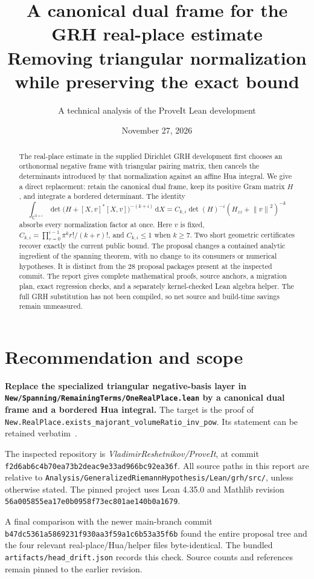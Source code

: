 \documentclass[11pt,letterpaper]{article}
\title{\textbf{A canonical dual frame for the GRH real-place estimate}\\[6pt]
  \large Removing triangular normalization while preserving the exact bound}
\author{A technical analysis of the ProveIt Lean development}
\date{November 27, 2026}
\theoremstyle{remark}
\newcommand{\C}{\mathbb C}
\newcommand{\dd}{\,\mathrm d}
\newcommand{\norm}[1]{\left\lVert#1\right\rVert}
\newcommand{\code}[1]{{\small\urlstyle{tt}\nolinkurl{#1}}}
\newcommand{\src}[1]{{\footnotesize\urlstyle{tt}\nolinkurl{#1}}}
\newcommand{\rev}{\code{f2d6ab6c4b70ea73b2deac9e33ad966bc92ea36f}}
\begin{document}
\maketitle
\begin{abstract}
The real-place estimate in the supplied Dirichlet GRH development first chooses an
orthonormal negative frame with triangular pairing matrix, then cancels the
determinants introduced by that normalization against an affine Hua integral.
We give a direct replacement: retain the canonical dual frame, keep its positive
Gram matrix $H$, and integrate a bordered determinant. The identity
\[
 \int_{\C^{k\times i}}
 \det\bigl(H+[X,v]^*[X,v]\bigr)^{-(k+i)}\dd X
 =C_{k,i}\det(H)^{-i}(H_{zz}+\norm v^2)^{-k}
\]
absorbs every normalization factor at once. Here $v$ is fixed,
$C_{k,i}=\prod_{r=0}^{i-1}\pi^k r!/(k+r)!$, and $C_{k,i}\leq1$ when $k\geq7$.
Two short geometric certificates recover exactly the current public bound.
The proposal changes a contained analytic ingredient of the spanning theorem,
with no change to its consumers or numerical hypotheses. It is distinct from the
28 proposal packages present at the inspected commit. The report gives complete
mathematical proofs, source anchors, a migration plan, exact regression checks,
and a separately kernel-checked Lean algebra helper. The full GRH substitution
has not been compiled, so net source and build-time savings remain unmeasured.
\end{abstract}

\tableofcontents
\newpage

\section{Recommendation and scope}

\textbf{Replace the specialized triangular negative-basis layer in
\code{New/Spanning/RemainingTerms/OneRealPlace.lean} by a canonical dual frame and
a bordered Hua integral.} The target is the proof of
\code{New.RealPlace.exists_majorant_volumeRatio_inv_pow}. Its statement can be
retained verbatim~\cite{source}.

The inspected repository is \emph{VladimirReshetnikov/ProveIt}, at commit
\rev. All source paths in this report are relative to
\src{Analysis/GeneralizedRiemannHypothesis/Lean/grh/src/}, unless otherwise stated.
The pinned project uses Lean 4.35.0 and Mathlib revision
\code{56a005855ea17e0b0958f73ec801ae140b0a1679}.

A final comparison with the newer main-branch commit
\code{b47dc5361a5869231f930aa3f59a1c6b53a35f6b} found the entire proposal tree
and the four relevant real-place/Hua/helper files byte-identical. The bundled
\code{artifacts/head_drift.json} records this check. Source counts and references
remain pinned to the earlier revision.
\end{document}
